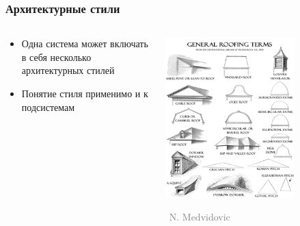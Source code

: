 \documentclass[xetex,mathserif,serif]{beamer}
\newcommand{\attribution}[1] {
	\vspace{-5mm}\begin{flushright}\begin{scriptsize}\textcolor{gray}{\textcopyright\, #1}\end{scriptsize}\end{flushright}
}
\begin{document}
	\begin{frame}
		\frametitle{Архитектурные стили}
		\begin{columns}
			\begin{column}{0.5\textwidth}
				\begin{itemize}
					\item Одна система может включать в себя несколько архитектурных стилей
					\item Понятие стиля применимо и к подсистемам
				\end{itemize}
			\end{column}
			\begin{column}{0.5\textwidth}
				\begin{center}
					\includegraphics[width=0.7\textwidth]{roofStyles.png}
					\attribution{N. Medvidovic}
				\end{center}
			\end{column}
		\end{columns}
	\end{frame}
\end{document}
